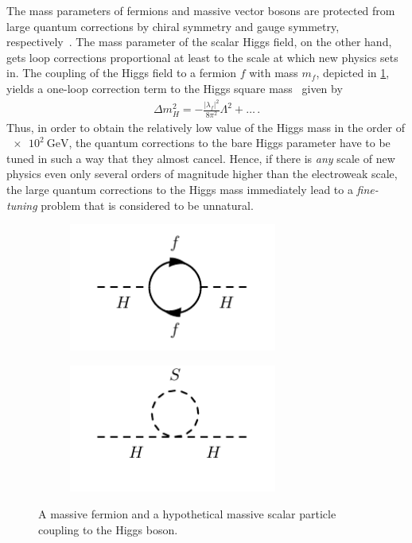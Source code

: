 The mass parameters of fermions and massive vector bosons are protected from large quantum corrections by chiral symmetry and gauge symmetry, respectively~\cite{Aitchison:2007fn}. The mass parameter of the scalar Higgs field, on the other hand, gets loop corrections proportional at least to the scale at which new physics sets in. The coupling of the Higgs field to a fermion $f$ with mass $m_f$, depicted in \cref{fig:fermion_loop}, yields a one-loop correction term to the Higgs square mass~\cite{Martin:1997ns} given by
\begin{align}
	\Delta m_H^2 = -\frac{\lvert\lambda_f\rvert^2}{8\pi^2} \Lambda^2 + \dots\, .
	\label{eq:fermion_correction}
\end{align}
Thus, in order to obtain the relatively low value of the Higgs mass in the order of $\SI{e2}{\GeV}$, the quantum corrections to the bare Higgs parameter have to be tuned in such a way that they almost cancel.  Hence, if there is \textit{any} scale of new physics even only several orders of magnitude higher than the electroweak scale, the large quantum corrections to the Higgs mass immediately lead to a \textit{fine-tuning} problem that is considered to be unnatural.

\begin{figure}
	\centering
	\begin{subfigure}[b]{0.5\linewidth}
		\centering\includegraphics[width=0.75\textwidth]{fermion_loop}
		\caption{\label{fig:fermion_loop}}
	\end{subfigure}%
	\begin{subfigure}[b]{0.5\linewidth}
		\centering\includegraphics[width=0.75\textwidth]{scalar_loop}
		\caption{\label{fig:scal_loop}}
	\end{subfigure}	
	\caption{A massive fermion  and a hypothetical massive scalar particle  coupling to the Higgs boson.}\label{fig:loop_corrections_higgs}
\end{figure}

